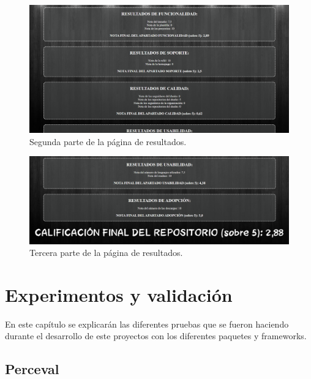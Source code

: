 \documentclass[a4paper, 12pt]{book}
\begin{document}
\begin{figure}
    
    \includegraphics[bb=0 0 800 600, width=12cm, keepaspectratio]{img/resultados_2.png}
    \caption{Segunda parte de la página de resultados.}\label{fig:resultados_2}
\end{figure}

\begin{figure}
    
    \includegraphics[bb=0 0 800 600, width=12cm, keepaspectratio]{img/resultados_3.png}
    \caption{Tercera parte de la página de resultados.}\label{fig:resultados_3}
\end{figure}



\cleardoublepage
\chapter{Experimentos y validación}
\label{chap:experimentos}

En este capítulo se explicarán las diferentes pruebas que se fueron haciendo durante el desarrollo de este proyectos con los diferentes paquetes y frameworks.

\section{Perceval}
\end{document}
